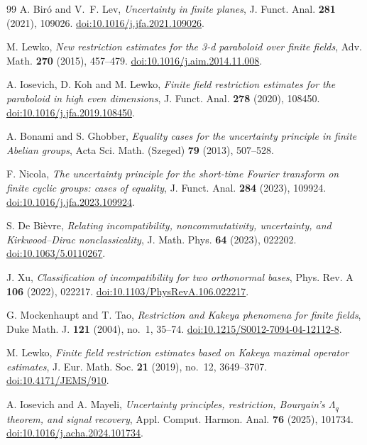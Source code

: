 \documentclass[11pt]{article}
\begin{document}
\begin{thebibliography}{99}
A. Bir\'o and V.~F. Lev,
\emph{Uncertainty in finite planes},
J. Funct. Anal. \textbf{281} (2021), 109026.
\href{https://doi.org/10.1016/j.jfa.2021.109026}{doi:10.1016/j.jfa.2021.109026}.

M. Lewko,
\emph{New restriction estimates for the 3-d paraboloid over finite fields},
Adv. Math. \textbf{270} (2015), 457--479.
\href{https://doi.org/10.1016/j.aim.2014.11.008}{doi:10.1016/j.aim.2014.11.008}.

A. Iosevich, D. Koh and M. Lewko,
\emph{Finite field restriction estimates for the paraboloid in high even dimensions},
J. Funct. Anal. \textbf{278} (2020), 108450.
\href{https://doi.org/10.1016/j.jfa.2019.108450}{doi:10.1016/j.jfa.2019.108450}.



A. Bonami and S. Ghobber,
\emph{Equality cases for the uncertainty principle in finite Abelian groups},
Acta Sci. Math. (Szeged) \textbf{79} (2013), 507--528.

F. Nicola,
\emph{The uncertainty principle for the short-time Fourier transform on finite cyclic groups: cases of equality},
J. Funct. Anal. \textbf{284} (2023), 109924.
\href{https://doi.org/10.1016/j.jfa.2023.109924}{doi:10.1016/j.jfa.2023.109924}.

S. De Bi\`evre,
\emph{Relating incompatibility, noncommutativity, uncertainty, and Kirkwood--Dirac nonclassicality},
J. Math. Phys. \textbf{64} (2023), 022202.
\href{https://doi.org/10.1063/5.0110267}{doi:10.1063/5.0110267}.

J. Xu,
\emph{Classification of incompatibility for two orthonormal bases},
Phys. Rev. A \textbf{106} (2022), 022217.
\href{https://doi.org/10.1103/PhysRevA.106.022217}{doi:10.1103/PhysRevA.106.022217}.

G. Mockenhaupt and T. Tao,
\emph{Restriction and Kakeya phenomena for finite fields},
Duke Math. J. \textbf{121} (2004), no.~1, 35--74.
\href{https://doi.org/10.1215/S0012-7094-04-12112-8}{doi:10.1215/S0012-7094-04-12112-8}.

M. Lewko,
\emph{Finite field restriction estimates based on Kakeya maximal operator estimates},
J. Eur. Math. Soc. \textbf{21} (2019), no.~12, 3649--3707.
\href{https://doi.org/10.4171/JEMS/910}{doi:10.4171/JEMS/910}.

A. Iosevich and A. Mayeli,
\emph{Uncertainty principles, restriction, Bourgain's $\Lambda_q$ theorem, and signal recovery},
Appl. Comput. Harmon. Anal. \textbf{76} (2025), 101734.
\href{https://doi.org/10.1016/j.acha.2024.101734}{doi:10.1016/j.acha.2024.101734}.


\end{thebibliography}
\end{document}
